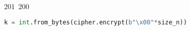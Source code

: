 201~200~\documentclass{article}
\begin{document}
\begin{lstlisting}[language=Python, caption=Signature function Chall 2]
	                                                                        	                                                                    	                                	                    	                    	                        	                        	                    	                                                                	                	                                                                    	                    							                                                                                                                                                                                        k = int.from_bytes(cipher.encrypt(b"\x00"*size_n))
	                                                                        	                                                                    	                                	                    	                    	                        	                        	                    	                                                                	                	                                                                    	                    							                                                                                                                                                                                            (x1,y1) = (k*G).xy()
	                                                                        	                                                                    	                                	                    	                    	                        	                        	                    	                                                                	                	                                                                    	                    							                                                                                                                                                                                                r = F(x1)
	                                                                        	                                                                    	                                	                    	                    	                        	                        	                    	                                                                	                	                                                                    	                    							                                                                                                                                                                                                    return (r, (F(h(m)) +a * r) /F(k))

\end{lstlisting}
\end{document}
